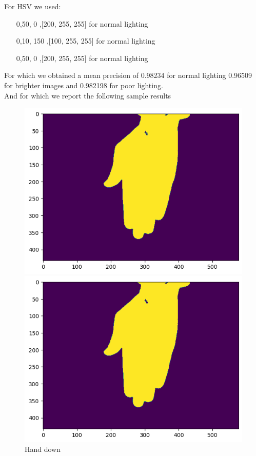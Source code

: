 \documentclass{report}
\begin{document}
For HSV we used:
\begin{itemize}
  \item [0,50, 0],[200, 255, 255] for normal lighting
  \item  [0,10, 150],[100, 255, 255] for normal lighting
  \item [0,50, 0],[200, 255, 255]  for normal lighting
\end{itemize}
For which we obtained a mean precision of 0.98234 for normal lighting 0.96509 for brighter images
and 0.982198 for poor lighting.\\
And for which we report the following sample results\\
\begin{figure}[H]
    \includegraphics[width=\linewidth]{Images/hand_downHSV.png}
    \caption{Hand down}
  \endminipage\hfill
    \includegraphics[width=\linewidth]{Images/hand_normalHSV.png}

\end{figure}
\end{document}
